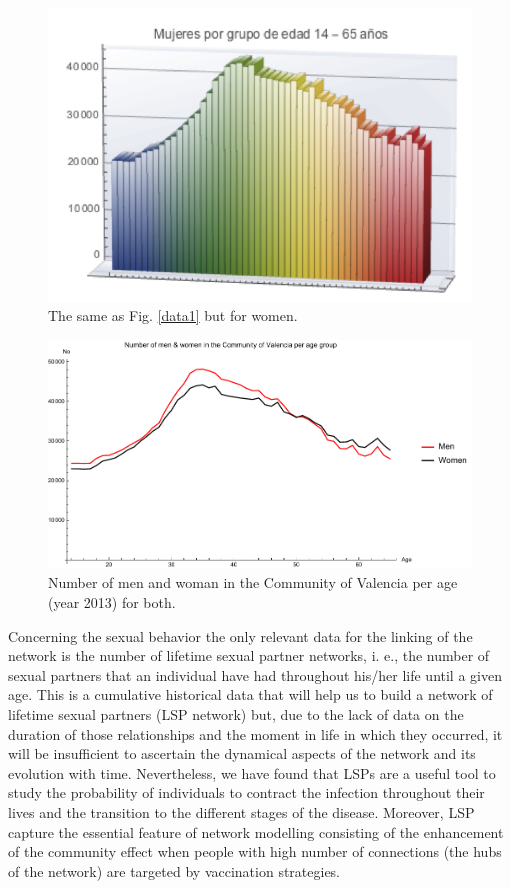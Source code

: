 \begin{figure}[ht]
	\centering
	\includegraphics[scale=0.7]{IMG/data2.png}
	\caption{The same as Fig. \ref{data1} but for women.}
	\label{data2}
\end{figure} 

\begin{figure}[ht]
	\centering
	\includegraphics[scale=0.7]{demog.pdf}
	\caption{Number of men and woman in the Community of Valencia per age (year 2013) for both.}
	\label{demog}
\end{figure}

Concerning the sexual behavior the only relevant data for the linking of the network is the number of lifetime sexual partner networks, i. e., the number of sexual partners that an individual have had throughout his/her life until a given age. This is a cumulative historical data that will help us to build a network of lifetime sexual partners (LSP network) but, due to the lack of data on the duration of those relationships and the moment in life in which they occurred, it will be insufficient to ascertain the dynamical aspects of the network and its evolution with time. Nevertheless, we have found that LSPs are a useful tool to study the probability of individuals to contract the infection throughout their lives and the transition to the different stages of the disease. Moreover, LSP capture the essential feature of network modelling consisting of the enhancement of the community effect when people with high number of connections (the hubs of the network) are targeted by vaccination strategies.

